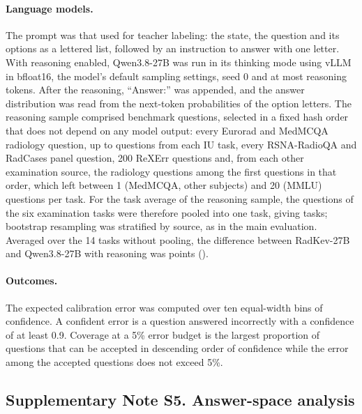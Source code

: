 \documentclass[11pt]{article}
\begin{document}
\paragraph{Language models.} The prompt was that used for teacher labeling: the state, the question and its options as a lettered list, followed by an instruction to answer with one letter. With reasoning enabled, Qwen3.8-27B was run in its thinking mode using vLLM  in bfloat16, the model's default sampling settings, seed 0 and at most  reasoning tokens. After the reasoning, ``Answer:'' was appended, and the answer distribution was read from the next-token probabilities of the option letters. The reasoning sample comprised  benchmark questions, selected in a fixed hash order that does not depend on any model output: every Eurorad and MedMCQA radiology question, up to  questions from each IU task, every RSNA-RadioQA and RadCases panel question, 200 ReXErr questions and, from each other examination source, the radiology questions among the first  questions in that order, which left between 1 (MedMCQA, other subjects) and 20 (MMLU) questions per task. For the task average of the reasoning sample, the questions of the six examination tasks were therefore pooled into one task, giving  tasks; bootstrap resampling was stratified by source, as in the main evaluation. Averaged over the 14 tasks without pooling, the difference between RadKev-27B and Qwen3.8-27B with reasoning was  points ().

\paragraph{Outcomes.} The expected calibration error was computed over ten equal-width bins of confidence. A confident error is a question answered incorrectly with a confidence of at least 0.9. Coverage at a 5\% error budget is the largest proportion of questions that can be accepted in descending order of confidence while the error among the accepted questions does not exceed 5\%.

\FloatBarrier
\subsection*{Supplementary Note S5. Answer-space analysis}
\end{document}
